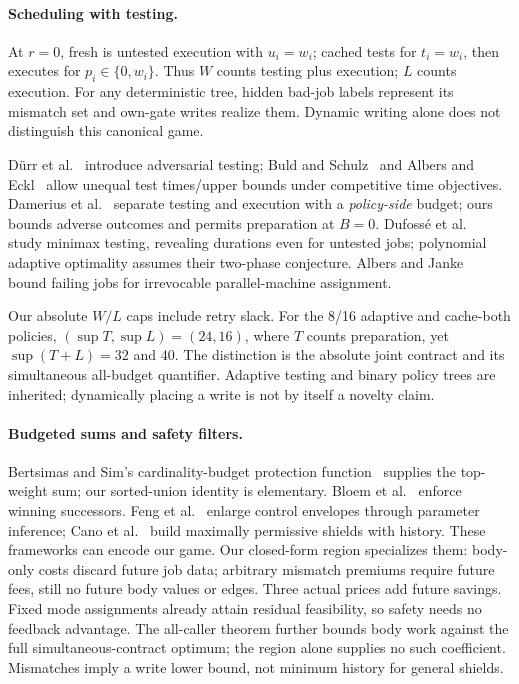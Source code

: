 \documentclass[acmsmall,screen,review,anonymous]{acmart}
\begin{document}
\paragraph{Scheduling with testing.}
At $r=0$, fresh is untested execution with $u_i=w_i$; cached tests for $t_i=w_i$, then executes for $p_i\in\{0,w_i\}$. Thus $W$ counts testing plus execution; $L$ counts execution. For any deterministic tree, hidden bad-job labels represent its mismatch set and own-gate writes realize them. Dynamic writing alone does not distinguish this canonical game.

D\"urr et al.~\cite{durrtesting} introduce adversarial testing; Buld and Schulz~\cite{buldtesting} and Albers and Eckl~\cite{alberseckl} allow unequal test times/upper bounds under competitive time objectives. Damerius et al.~\cite{dameriustesting} separate testing and execution with a \emph{policy-side} budget; ours bounds adverse outcomes and permits preparation at $B=0$. Dufoss\'e et al.~\cite{dufosseoracle} study minimax testing, revealing durations even for untested jobs; polynomial adaptive optimality assumes their two-phase conjecture. Albers and Janke~\cite{albersjanke} bound failing jobs for irrevocable parallel-machine assignment.

Our absolute $W/L$ caps include retry slack. For the 8/16 adaptive and cache-both policies, $(\sup T,\sup L)=(24,16)$, where $T$ counts preparation, yet $\sup(T+L)=32$ and 40. The distinction is the absolute joint contract and its simultaneous all-budget quantifier. Adaptive testing and binary policy trees are inherited; dynamically placing a write is not by itself a novelty claim.

\paragraph{Budgeted sums and safety filters.}
Bertsimas and Sim's cardinality-budget protection function~\cite[Section~3]{bertsimas} supplies the top-weight sum; our sorted-union identity is elementary. Bloem et al.~\cite[Sections~3--5]{bloem2015} enforce winning successors. Feng et al.~\cite[Sections~4.4--4.5]{feng2025} enlarge control envelopes through parameter inference; Cano et al.~\cite[Appendix~A]{cano2026} build maximally permissive shields with history. These frameworks can encode our game. Our closed-form region specializes them: body-only costs discard future job data; arbitrary mismatch premiums require future fees, still no future body values or edges. Three actual prices add future savings. Fixed mode assignments already attain residual feasibility, so safety needs no feedback advantage. The all-caller theorem further bounds body work against the full simultaneous-contract optimum; the region alone supplies no such coefficient. Mismatches imply a write lower bound, not minimum history for general shields.
\end{document}

